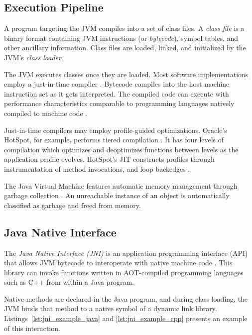 \subsection{Execution Pipeline}

A program targeting the JVM compiles into a set of class files. A \textit{class file} is a binary format containing JVM instructions (or \emph{bytecode}), symbol tables, and other ancillary information. Class files are loaded, linked, and initialized by the JVM's \emph{class loader}.

The JVM executes classes once they are loaded. Most software implementations employ a just-in-time compiler \cite{kotzmann2008design}\nocite{paleczny2001java}. Bytecode compiles into the host machine instruction set as it gets interpreted. The compiled code can execute with performance characteristics comparable to programming languages natively compiled to machine code \cite{gherardi2012java,taboada2013java}.

Just-in-time compilers may employ profile-guided optimizations. Oracle's HotSpot, for example, performs tiered compilation \cite{java7tier}. It has four levels of compilation which optimizes and deoptimizes functions between levels as the application profile evolves. HotSpot's JIT constructs profiles through instrumentation of method invocations, and loop backedges \cite{openjdktier}.

The Java Virtual Machine features automatic memory management through garbage collection \cite{pufek2019gc}. An unreachable instance of an object is automatically classified as garbage and freed from memory.

\subsection{Java Native Interface}

The \emph{Java Native Interface (JNI)} is an application programming interface (API) that allows JVM bytecode to interoperate with native machine code \cite{jni}. This library can invoke functions written in AOT-compiled programming languages such as C++ from within a Java program.

Native methods are declared in the Java program, and during class loading, the JVM binds that method to a native symbol of a dynamic link library. Listings~\ref{lst:jni_example_java} and \ref{lst:jni_example_cpp} presents an example of this interaction.

